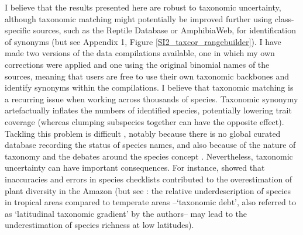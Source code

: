 I believe that the results presented here are robust to taxonomic uncertainty, although taxonomic matching might potentially be improved further using class-specific sources, such as the Reptile Database or AmphibiaWeb, for identification of synonyms (but see Appendix 1, Figure \ref{SI2_taxcor_rangebuilder}). I have made two versions of the data compilations available, one in which my own corrections were applied and one using the original binomial names of the sources, meaning that users are free to use their own taxonomic backbones and identify synonyms within the compilations.
I believe that taxonomic matching is a recurring issue when working across thousands of species. Taxonomic synonymy artefactually inflates the numbers of identified species, potentially lowering trait coverage (whereas clumping subspecies together can have the opposite effect). Tackling this problem is difficult \citep{Isaac2004, Jones2012}, notably because there is no global curated database recording the status of species names, and also because of the nature of taxonomy and the debates around the species concept \citep{May2011}. Nevertheless, taxonomic uncertainty can have important consequences. For instance, \citet{Cardoso2017} showed that inaccuracies and errors in species checklists contributed to the overestimation of plant diversity in the Amazon (but see \citet{Freeman2021}: the relative underdescription of species in tropical areas compared to temperate  areas --`taxonomic debt', also referred to as `latitudinal taxonomic gradient' by the authors-- may lead to the underestimation of species richness at low latitudes).

